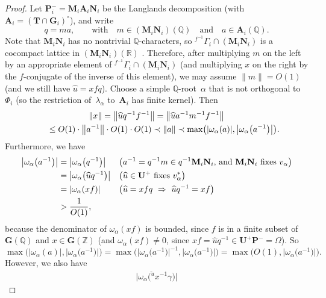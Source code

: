 \documentclass[11pt]{article}
\numberwithin{equation}{section}
\newcommand{\QQ}{\mathbb{Q}}
\newcommand{\RR}{\mathbb{R}}
\newcommand{\ZZ}{\mathbb{Z}}
\newcommand{\Aa}{\mathbf{A}}
\newcommand{\Ga}{\mathbf{G}}
\newcommand{\Ma}{\mathbf{M}}
\newcommand{\Na}{\mathbf{N}}
\newcommand{\Pa}{\mathbf{P}}
\newcommand{\Ta}{\mathbf{T}}
\newcommand{\Ua}{\mathbf{U}}
\numberwithin{equation}{section}
\theoremstyle{definition}
\begin{document}
\begin{proof}
Let $\Pa_i^- = \Ma_i \Aa_i \Na_i$ be the Langlands decomposition (with $\Aa_i = (\Ta \cap \Ga_i)^\circ$), and write
	\[ q = ma, \qquad \text{with} \quad m \in (\Ma_i \Na_i)(\QQ) \quad \text{and} \quad a \in \Aa_i(\QQ) .\]
Note that $\Ma_i \Na_i$ has no nontrivial $\QQ$-characters, so ${}^{f^{-1}} \Gamma_i \cap (\Ma_i \Na_i)$ is a cocompact lattice in $(\Ma_i \Na_i)(\RR)$ \cite[Theorem~4.12, p.~210]{MR1278263}. Therefore, after multiplying $m$ on the left by an appropriate element of ${}^{f^{-1}} \Gamma_i \cap (\Ma_i \Na_i)$ (and multiplying $x$ on the right by the $f$-conjugate of the inverse of this element), we may assume $\| m \| = O(1)$ (and we still have $\widehat{u} = x f q$). Choose a simple $\QQ$-root~$\alpha$ that is not orthogonal to $\Phi_i$ (so the restriction of~$\lambda_\alpha$ to~$\Aa_i$ has finite kernel). Then
	\begin{gather*}
	\|x\| = \big\| \widehat{u} q^{-1} f^{-1}\big\|
	= \big\| \widehat{u} a^{-1} m^{-1} f^{-1}\big\|\\
\hphantom{\|x\|}{} \le O(1) \cdot \big\|a^{-1}\big\| \cdot O(1) \cdot O(1)
	\prec \|a\|
	\prec \max \bigl( |\omega_\alpha(a)|, \big|\omega_\alpha\big(a^{-1}\big)\big| \bigr)
	. \end{gather*}
Furthermore, we have
	\begin{align*}
	\big|\omega_\alpha\big(a^{-1}\big)\big|
	&=\big|\omega_\alpha\big(q^{-1}\big)\big|
		&& \text{\big($a^{-1} = q^{-1} m \in q^{-1} \Ma_i \Na_i$, and $\Ma_i \Na_i$ fixes~$v_\alpha$\big)}
	\\&=\big|\omega_\alpha\big(\widehat{u} q^{-1}\big)\big|
		&& \text{\big($\widehat{u} \in \Ua^+$ fixes $v_\alpha^*$\big)}
	\\&=|\omega_\alpha(x f)|
		&& \text{\big($\widehat{u} = x f q \ \Rightarrow \ \widehat{u} q^{-1} = x f$\big)}
	\\& > \frac{1}{O(1)}	,
\end{align*}
 because the denominator of $\omega_\alpha(x f)$ is bounded, since $f$ is in a finite subset of $\Ga(\QQ)$ and $x \in \Ga(\ZZ)$ (and $\omega_\alpha(x f)\neq 0$, since $x f = \widehat{u} q^{-1} \in \Ua^+ \Pa^- = \Omega$). So
	\[ \max \bigl( |\omega_\alpha(a)|, \big|\omega_\alpha\big(a^{-1}\big)\big| \bigr)
	= \max \bigl( \big|\omega_\alpha\big(a^{-1}\big)\big|^{-1}, \big|\omega_\alpha\big(a^{-1}\big)\big| \bigr)
	= \max \bigl( O(1), \big|\omega_\alpha\big(a^{-1}\big)\big| \bigr) .\]
However, we also have
	\begin{align*}
	\big| \omega_\alpha \big( {}^{\overleftarrow{u}} \! \! x^{-1} \gamma\big) \big|

\end{align*}
\end{proof}
\end{document}
